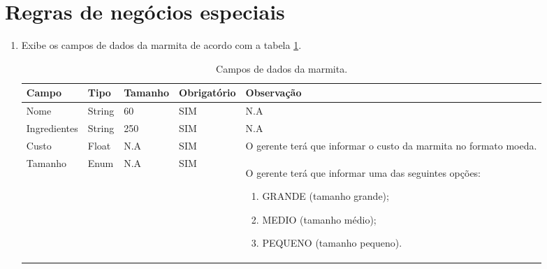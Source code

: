 \section{Regras de negócios especiais}

\begin{enumerate}[label=RN\arabic*]
	\item Exibe os campos de dados da marmita de acordo com a tabela \ref{uc005_tb_rn1}. \label{uc005_rn:1}
	\begin{table}[htb]
		\ABNTEXfontereduzida
		\caption[Campos de dados da marmita]{Campos de dados da marmita.}
		\label{uc005_tb_rn1}
		\begin{tabular}{|p{3.0cm}|p{2.0cm}|p{1.5cm}|p{2.0cm}|p{5.75cm}|}
			\hline
			\textbf{Campo} & \textbf{Tipo} & \textbf{Tamanho} & \textbf{Obrigatório} & \textbf{Observação}                                              \\ \hline
			Nome           & String        & 60               & SIM                  & N.A                                                              \\ \hline
			Ingredientes   & String        & 250              & SIM                  & N.A                                                              \\ \hline
			Custo          & Float         & N.A              & SIM                  & O gerente terá que informar o custo da marmita no formato moeda. \\ \hline
			Tamanho        & Enum          & N.A              & SIM                  & O gerente terá que informar uma das seguintes opções: 	
			\begin{enumerate}
				\item GRANDE (tamanho grande);
				\item MEDIO (tamanho médio);
				\item PEQUENO (tamanho pequeno).
			\end{enumerate}\\ \hline
		\end{tabular}
	\end{table}
\end{enumerate}